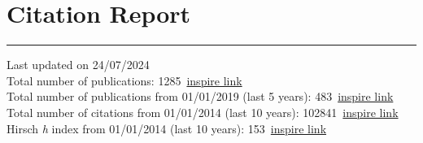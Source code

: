 \documentclass[10pt, a4paper]{article}
\newcommand{\years}[1]{\marginnote{\hskip-0.2in{\scriptsize #1}}}
\begin{document}
\section*{Citation Report}
\vspace{-5pt}
\hrule
\vspace{10pt}
\noindent
Last updated on 24/07/2024\\[1em]
Total number of publications:
1285~\href{https://inspirehep.net/literature?sort=mostrecent&size=25&page=1&q=find\%20a\%20santanastasio\%20and\%20tc\%20p\%20and\%20date\%3C\%3D2024-07-24}{inspire
link}\\
Total number of publications from 01/01/2019 (last 5 years): 483~\href{https://inspirehep.net/literature?sort=mostrecent&size=25&page=1&q=find\%20a\%20santanastasio\%20and\%20tc\%20p\%20and\%20date\%3C\%3D2024-07-24\%20and\%20date\%3E\%3D2019-01-01}{inspire
link}\\
Total number of citations from 01/01/2014 (last 10 years): 102841~\href{https://inspirehep.net/literature?sort=mostrecent&size=25&page=1&q=find\%20a\%20santanastasio\%20and\%20tc\%20p\%20and\%20date\%3E\%3D2014-01-01\%20and\%20date\%3C\%3D2024-07-24&ui-citation-summary=true}{inspire
link}\\
Hirsch {\it h} index from 01/01/2014 (last 10 years): 153~\href{https://inspirehep.net/literature?sort=mostrecent&size=25&page=1&q=find\%20a\%20santanastasio\%20and\%20tc\%20p\%20and\%20date\%3E\%3D2014-01-01\%20and\%20date\%3C\%3D2024-07-24&ui-citation-summary=true}{inspire
link}\\
\end{document}
